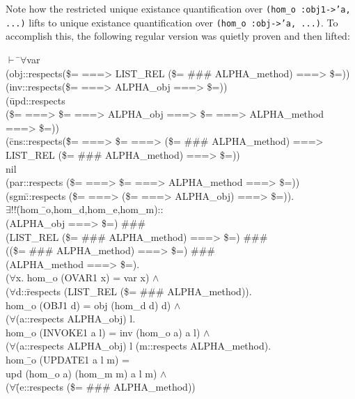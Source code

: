 \documentclass[envcountsame,runningheads]{llncs}
\begin{document}
\noindent
Note how the restricted unique existance quantification
over {\tt (hom\_o :obj1->'a,
...)}
lifts to unique existance quantification over {\tt (hom\_o :obj->'a,
...)}.
To accomplish this,
the following regular version was quietly proven and then lifted:
{\tt \begin{tabbing}
$\vdash$ \=$\forall$var \\
\> (obj::respects(\$= ===> LIST\_REL (\$= \#\#\# ALPHA\_method) ===> \$=)) \\
\> (inv::respects(\$= ===> ALPHA\_obj ===> \$=)) \\
\> (\=upd::respects \\
\>\>(\$= ===> \$= ===> ALPHA\_obj ===> \$= ===> ALPHA\_method ===> \$=)) \\
\> (\=cns::respects(\=\$= ===> \$= ===> (\$= \#\#\# ALPHA\_method) ===> \\
\>\>\>            LIST\_REL (\$= \#\#\# ALPHA\_method) ===> \$=)) \\
\>\>nil \\
\> (par::respects (\$= ===> \$= ===> ALPHA\_method ===> \$=)) \\
\> (sgm\=::respects (\$= ===> (\$= ===> ALPHA\_obj) ===> \$=)). \\
\>\> $\exists !!$\=(hom\=\_o,hom\_d,hom\_e,hom\_m):: \\
\>\>\>\>  (ALPHA\_obj ===> \$=) \#\#\# \\
\>\>\>\>  (LIST\_REL (\$= \#\#\# ALPHA\_method) ===> \$=) \#\#\# \\
\>\>\>\>  ((\$= \#\#\# ALPHA\_method) ===> \$=) \#\#\# \\
\>\>\>\>  (ALPHA\_method ===> \$=). \\
\>\>\>($\forall$x. hom\_o (OVAR1 x) = var x) $\wedge$ \\
\>\>\>($\forall$d::\=respects (LIST\_REL (\$= \#\#\# ALPHA\_method)). \\
\>\>\>\>   hom\_o (OBJ1 d) = obj (hom\_d d) d) $\wedge$ \\
\>\>\>($\forall$(a::respects ALPHA\_obj) l. \\
\>\>\>\>   hom\_o (INVOKE1 a l) = inv (hom\_o a) a l) $\wedge$ \\
\>\>\>($\forall$(a::respects ALPHA\_obj) l (m::respects ALPHA\_method). \\
\>\>\>\>   hom\=\_o (UPDATE1 a l m) = \\
\>\>\>\>\>    upd (hom\_o a) (hom\_m m) a l m) $\wedge$ \\
\>\>\>($\forall$\=(e::respects (\$= \#\#\# ALPHA\_method)) \\

\end{tabbing}}
\end{document}
